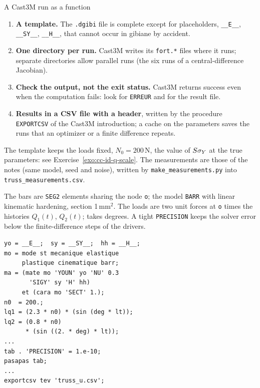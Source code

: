 \begin{gbox}{A Cast3M run as a function}\label{cc:box-run}
\begin{enumerate}[label=\textbf{\arabic*.},leftmargin=1.6em]
\item \textbf{A template.} The \texttt{.dgibi} file is complete except for
  placeholders, \texttt{\_\_E\_\_}, \texttt{\_\_SY\_\_}, \texttt{\_\_H\_\_}, that
  cannot occur in gibiane by accident.
\item \textbf{One directory per run.} Cast3M writes its \texttt{fort.*} files
  where it runs; separate directories allow parallel runs (the six runs of a
  central-difference Jacobian).
\item \textbf{Check the output, not the exit status.} Cast3M returns success
  even when the computation fails: look for \texttt{ERREUR} and for the result
  file.
\item \textbf{Results in a CSV file with a header}, written by the procedure
  \texttt{EXPORTCSV} of the Cast3M introduction; a cache on the parameters
  saves the runs that an optimizer or a finite difference repeats.
\end{enumerate}
\end{gbox}

\noindent The template keeps the loads fixed, $N_0=200$\,N, the value of
$S\sigma_{Y}$ at the true parameters: see Exercise~\ref{exo:cc-id-q-scale}. The measurements are those
of the notes (same model, seed and noise), written by
\texttt{make\_measurements.py} into \texttt{truss\_measurements.csv}.

\begin{castemcom}
The bars are \texttt{SEG2} elements sharing the node \texttt{o}; the model
\texttt{BARR} with linear kinematic hardening, section 1\,mm$^2$. The loads
are two unit forces at \texttt{o} times the histories $Q_1(t)$, $Q_2(t)$;
 takes degrees. A tight \texttt{PRECISION} keeps the solver error
below the finite-difference steps of the drivers.
\end{castemcom}
\begin{castemlines}
\begin{verbatim}
yo = __E__;  sy = __SY__;  hh = __H__;
mo = mode st mecanique elastique
     plastique cinematique barr;
ma = (mate mo 'YOUN' yo 'NU' 0.3
       'SIGY' sy 'H' hh)
     et (cara mo 'SECT' 1.);
n0  = 200.;
lq1 = (2.3 * n0) * (sin (deg * lt));
lq2 = (0.8 * n0)
      * (sin ((2. * deg) * lt));
...
tab . 'PRECISION' = 1.e-10;
pasapas tab;
...
exportcsv tev 'truss_u.csv';
\end{verbatim}
\end{castemlines}

